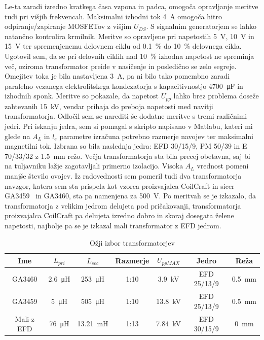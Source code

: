 \documentclass[a4paper,twoside,openright,12pt,Slovene]{book}
\begin{document}
Le-ta zaradi izredno kratkega časa vzpona in padca, omogoča opravljanje meritve tudi pri višjih frekvencah. Maksimalni izhodni tok \SI{4}{\ampere} omogoča hitro odpiranje/zapiranje MOSFETov z višjim \(U_{DS}\). S signalnim generatorjem se lahko natančno kontrolira krmilnik. Meritve so opravljene pri napetostih \SI{5}{\volt}, \SI{10}{\volt} in \SI{15}{\volt} ter spremenjenemu delovnem ciklu od \SI{0.1}{\percent} do \SI{10}{\percent} delovnega cikla. Ugotovil sem, da se pri delovnih ciklih nad \SI{10}{\percent} izhodna napetost ne spreminja več, oziroma transformator preide v nasičenje in posledično se zelo segreje. Omejitev toka je bila nastavljena \SI{3}{\ampere}, pa ni bilo tako pomembno zaradi paralelno vezanega elektrolitskega kondezatorja s kapacitivnostjo \SI{4700}{\micro\farad} in izhodnih sponk. Meritve so pokazale, da napetost \(U_{pp}\) lahko brez problema doseže zahtevanih \SI{15}{\kilo\volt}, vendar prihaja do preboja napetosti med navitji transformatorja. Odločil sem se narediti še dodatne meritve s tremi različnimi jedri. Pri iskanju jedra, sem si pomagal s skripto napisano v Matlabu, kateri mi glede na \(A_L\) in \(l_e\) parametre izračuna potrebno razmerje navojev ter maksimalni magnetilni tok. Izbrana so bila naslednja jedra: EFD 30/15/9, PM 50/39 in E 70/33/32 z \SI{1.5}{\milli\meter} režo. Večja transformatorja sta bila precej obetavna, saj bi na tuljavniku lažje zagotavljali primerno izolacijo. Visoka \(A_L\) vrednost pomeni manjše število ovojev. Iz radovednosti sem pomeril tudi dva transformatorja navzgor, katera sem sta prispela kot vzorca proizvajalca CoilCraft in sicer GA3459~\cite{Coilcraft:GA3459} in GA3460, sta pa namenjena za \SI{500}{\volt}. Po meritvah se je izkazalo, da transformatorja z velikim jedrom delujeta pod pričakovanji, transformatorja proizvajalca CoilCraft pa delujeta izredno dobro in skoraj dosegata želene napetosti, najbolje pa se je izkazal mali transformator z EFD jedrom. 
 
\begin{table}[h!]
\centering
\begin{tabular}{||c|c|c|c|c|c|c||}
\hline
Ime & \(L_{pri}\) & \(L_{sec}\) & Razmerje & \(U_{pp MAX}\) & Jedro & Reža \\ [0.5ex]
\hline\hline
GA3460 & \SI{2.6}{\micro\henry} & \SI{253}{\micro\henry} & 1:10 & \SI{3.9}{\kilo\volt} & EFD 25/13/9 & \SI{0.5}{\milli\meter} \\
\hline
GA3459 & \SI{5}{\micro\henry} & \SI{505}{\micro\henry} & 1:10 & \SI{13.8}{\kilo\volt} & EFD 25/13/9 & \SI{0.5}{\milli\meter} \\
\hline
Mali z EFD & \SI{76}{\micro\henry} & \SI{13.21}{\milli\henry} & 1:13 & \SI{7.84}{\kilo\volt} & EFD 30/15/9 & \SI{0}{\milli\meter} \\
\hline
\end{tabular}

\caption{Ožji izbor transformatorjev}

\end{table}
\end{document}
